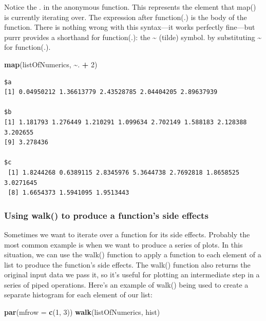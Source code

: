 \documentclass[
]{article}
\newenvironment{Shaded}{\begin{snugshade}}{\end{snugshade}}
\newcommand{\AttributeTok}[1]{\textcolor[rgb]{0.13,0.29,0.53}{#1}}
\newcommand{\DecValTok}[1]{\textcolor[rgb]{0.00,0.00,0.81}{#1}}
\newcommand{\FunctionTok}[1]{\textcolor[rgb]{0.13,0.29,0.53}{\textbf{#1}}}
\newcommand{\NormalTok}[1]{#1}
\newcommand{\SpecialCharTok}[1]{\textcolor[rgb]{0.81,0.36,0.00}{\textbf{#1}}}
\begin{document}
Notice the . in the anonymous function. This represents the element that
map() is currently iterating over. The expression after function(.) is
the body of the function. There is nothing wrong with this syntax---it
works perfectly fine---but purrr provides a shorthand for function(.):
the \textasciitilde{} (tilde) symbol. by substituting \textasciitilde{}
for function(.).

\begin{Shaded}
\begin{Highlighting}[]
\FunctionTok{map}\NormalTok{(listOfNumerics, }\SpecialCharTok{\textasciitilde{}}\NormalTok{. }\SpecialCharTok{+} \DecValTok{2}\NormalTok{)}
\end{Highlighting}
\end{Shaded}

\begin{verbatim}
$a
[1] 0.04950212 1.36613779 2.43528785 2.04404205 2.89637939

$b
[1] 1.181793 1.276449 1.210291 1.099634 2.702149 1.588183 2.128388 3.202655
[9] 3.278436

$c
 [1] 1.8244268 0.6389115 2.8345976 5.3644738 2.7692818 1.8658525 3.0271645
 [8] 1.6654373 1.5941095 1.9513443
\end{verbatim}

\subsubsection{Using walk() to produce a function's side
effects}\label{using-walk-to-produce-a-functions-side-effects}

Sometimes we want to iterate over a function for its side effects.
Probably the most common example is when we want to produce a series of
plots. In this situation, we can use the walk() function to apply a
function to each element of a list to produce the function's side
effects. The walk() function also returns the original input data we
pass it, so it's useful for plotting an intermediate step in a series of
piped operations. Here's an example of walk() being used to create a
separate histogram for each element of our list:

\begin{Shaded}
\begin{Highlighting}[]
\FunctionTok{par}\NormalTok{(}\AttributeTok{mfrow =} \FunctionTok{c}\NormalTok{(}\DecValTok{1}\NormalTok{, }\DecValTok{3}\NormalTok{))}
\FunctionTok{walk}\NormalTok{(listOfNumerics, hist)}
\end{Highlighting}
\end{Shaded}
\end{document}
